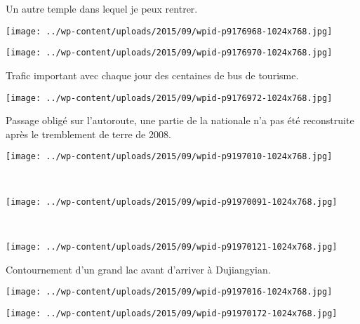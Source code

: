  Un autre temple dans lequel je peux rentrer.
\begin{center} \texttt{[image: ../wp-content/uploads/2015/09/wpid-p9176968-1024x768.jpg]} \end{center}
\begin{center} \texttt{[image: ../wp-content/uploads/2015/09/wpid-p9176970-1024x768.jpg]} \end{center}
\vspace{-\topsep}
\vspace{-3.25mm}
\pagebreak

 Trafic important avec chaque jour des centaines de bus de tourisme.
\begin{center} \texttt{[image: ../wp-content/uploads/2015/09/wpid-p9176972-1024x768.jpg]} \end{center}

 Passage obligé sur l'autoroute, une partie de la nationale n'a pas été reconstruite après le tremblement de terre de 2008. 
\begin{center} \texttt{[image: ../wp-content/uploads/2015/09/wpid-p9197010-1024x768.jpg]} \end{center}
\vspace{-\topsep}
\pagebreak

~
\vspace{0.75mm}
\begin{center} \texttt{[image: ../wp-content/uploads/2015/09/wpid-p91970091-1024x768.jpg]} \end{center}
~\\
\begin{center} \texttt{[image: ../wp-content/uploads/2015/09/wpid-p91970121-1024x768.jpg]} \end{center}
\vspace{-\topsep}
\pagebreak

 Contournement d'un grand lac avant d'arriver à Dujiangyian. \\
\begin{center} \texttt{[image: ../wp-content/uploads/2015/09/wpid-p9197016-1024x768.jpg]} \end{center}
\begin{center} \texttt{[image: ../wp-content/uploads/2015/09/wpid-p91970172-1024x768.jpg]} \end{center}
\vspace{-\topsep}
\vspace{-2.75mm}
\pagebreak

